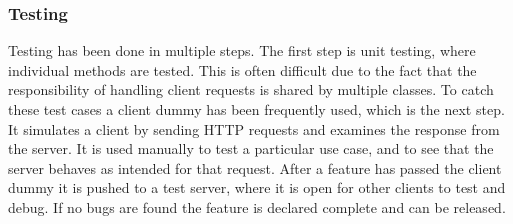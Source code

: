 \subsubsection{Testing}
Testing has been done in multiple steps. The first step is unit testing, where individual methods are tested. This is often difficult
due to the fact that the responsibility of handling client requests is shared by multiple classes. To catch these test cases a client
dummy has been frequently used, which is the next step. 
It simulates a client by sending HTTP requests and examines the response from the server. It is used
manually to test a particular use case, and to see that the server behaves as intended for that request.
After a feature has passed the client dummy it is pushed to a test server, where it is open for other clients to test and debug.
If no bugs are found the feature is declared complete and can be released.
